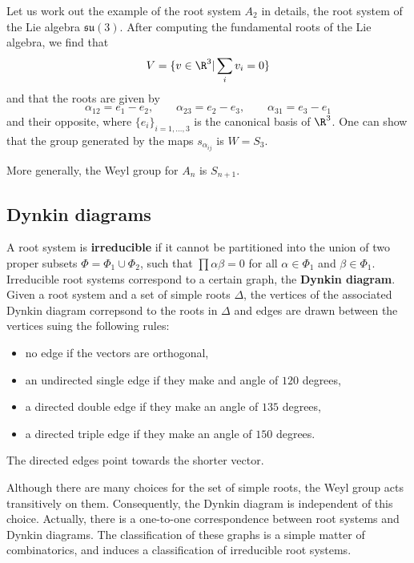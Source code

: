\documentclass{worksheetclass}
\renewcommand{\emph}{\textbf}
\begin{document}
        \begin{examp}
            Let us work out the example of the root system $A_2$ in details, the root system of the Lie algebra $\mathfrak{su(3)}$. After computing the fundamental roots of the Lie algebra, we find that
            \begin{equation}
                V=\{v\in\R^3|\sum_i v_i=0\}
            \end{equation}
            and that the roots are given by
            \begin{equation}
                \alpha_{12}=e_1-e_2,\qquad
                \alpha_{23}=e_2-e_3,\qquad
                \alpha_{31}=e_3-e_1
            \end{equation}
            and their opposite, where $\{e_i\}_{i=1,\dots,3}$ is the canonical basis of $\R^3$. One can show that the group generated by the maps $s_{\alpha_{ij}}$ is $W=S_3$.
        \end{examp}

        More generally, the Weyl group for $A_n$ is $S_{n+1}$.

    \subsection{Dynkin diagrams}

        A root system is \emph{irreducible} if it cannot be partitioned into the union of two proper subsets $\Phi=\Phi_1\cup\Phi_2$, such that $\prod{\alpha}{\beta}=0$ for all $\alpha\in\Phi_1$ and $\beta\in\Phi_1$. Irreducible root systems correspond to a certain graph, the \emph{Dynkin diagram}. Given a root system and a set of simple roots $\Delta$, the vertices of the associated Dynkin diagram correpsond to the roots in $\Delta$ and edges are drawn between the vertices suing the following rules:
        \begin{itemize}
            \item no edge if the vectors are orthogonal,
            \item an undirected single edge if they make and angle of $120$ degrees,
            \item a directed double edge if they make an angle of $135$ degrees,
            \item a directed triple edge if they make an angle of $150$ degrees.
        \end{itemize}
        The directed edges point towards the shorter vector. 
        
        Although there are many choices for the set of simple roots, the Weyl group acts transitively on them. Consequently, the Dynkin diagram is independent of this choice. Actually, there is a one-to-one correspondence between root systems and Dynkin diagrams. The classification of these graphs is a simple matter of combinatorics, and induces a classification of irreducible root systems.
\end{document}
